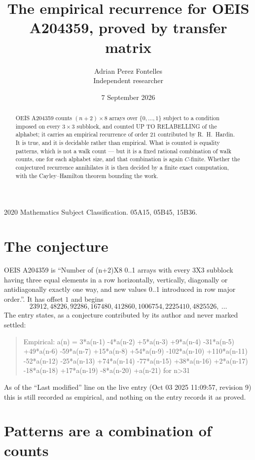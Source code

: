 \documentclass[11pt,a4paper]{article}
\title{The empirical recurrence for OEIS A204359, proved by transfer matrix}
\author{Adrian Perez Fontelles\\ \small Independent researcher}
\date{7 September 2026}
\theoremstyle{plain}
\theoremstyle{definition}
\begin{document}
\maketitle

\begin{abstract}
OEIS A204359 counts $(n+2)\times8$ arrays over $\{0,\dots,1\}$ subject to a condition imposed on
every $3\times3$ subblock, and counted UP TO RELABELLING of the
alphabet; it carries an empirical recurrence of order $21$ contributed by
R.~H.~Hardin. It is true, and it is decidable rather than empirical. What is counted is
equality patterns, which is not a walk count --- but it is a fixed rational combination of
walk counts, one for each alphabet size, and that combination is again $C$-finite. Whether the
conjectured recurrence annihilates it is then decided by a finite exact computation, with the
Cayley--Hamilton theorem bounding the work.
\end{abstract}

\noindent\small 2020 Mathematics Subject Classification. 05A15, 05B45, 15B36.\normalsize

\section{The conjecture}

OEIS A204359 is ``Number of (n+2)X8 0..1 arrays with every 3X3 subblock having three equal elements in a row horizontally, vertically, diagonally or antidiagonally exactly one way, and new values 0..1 introduced in row major order.''. It has offset $1$ and begins
\[
23912, 48226, 92286, 167480, 412860, 1006754, 2225410, 4825526,\ \dots
\]
The entry states, as a conjecture contributed by its author and never marked settled:
\begin{quote}
Empirical: a(n) = 3*a(n-1) -4*a(n-2) +5*a(n-3) +9*a(n-4) -31*a(n-5) +49*a(n-6) -59*a(n-7) +15*a(n-8) +54*a(n-9) -102*a(n-10) +110*a(n-11) -52*a(n-12) -25*a(n-13) +74*a(n-14) -77*a(n-15) +38*a(n-16) +2*a(n-17) -18*a(n-18) +17*a(n-19) -8*a(n-20) +a(n-21) for n>31
\end{quote}
As of the ``Last modified'' line on the live entry (Oct 03 2025 11:09:57, revision 9) this is still
recorded as empirical, and nothing on the entry records it as proved.

\section{Patterns are a combination of counts}
\end{document}
